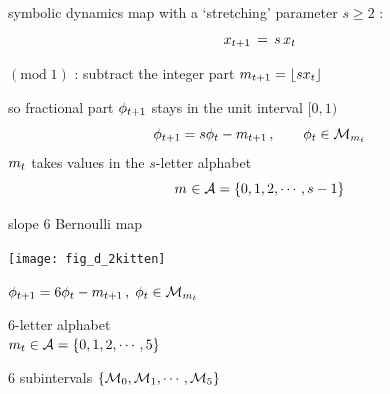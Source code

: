 \begin{frame}{symbolic dynamics} %
\renewcommand{\ssp}{\ensuremath{x}}             %
map with a {\color{blue}`stretching' parameter $s\geq2$} :
\[
\ssp_{\zeit+1} \,=\, {s}\,\ssp_{\zeit}
\] %

$(\mbox{mod}\;1)$ :
subtract the integer part
\(
\Ssym{\zeit+1}=\left\lfloor{s}\ssp_{\zeit}\right\rfloor
\)

\renewcommand{\ssp}{\ensuremath{\phi}}             %
so fractional part
$\ssp_{\zeit+1}$ stays in the unit interval $[0,1)$
\[
\ssp_{\zeit+1}
= {s} \ssp_{\zeit} - \Ssym{\zeit+1}
\,,\qquad  \ssp_{\zeit}\in\pS_{\Ssym{\zeit}}
\] %
${m_{t}}$ takes values in the ${s}$-letter alphabet
\[
{m_{}} \in \mathcal{A}=\{0,1,2,\cdots,s-1\}
\] %
\end{frame} %

\renewcommand{\ssp}{\ensuremath{\phi}}             %

\begin{frame}{}
    \begin{block}{slope ${6}$ Bernoulli map}
\begin{center}
            \begin{minipage}[c]{0.32\textwidth}\begin{center}
\texttt{[image: fig\_d\_2kitten]} %
            \end{center}\end{minipage}
            \hspace{2ex}
            \begin{minipage}[c]{0.46\textwidth}
\(
\ssp_{\zeit+1}
= {6} \ssp_{\zeit} - \Ssym{\zeit+1}
\,,\;  \ssp_{\zeit}\in\pS_{\Ssym{\zeit}}
\)
\medskip

${6}$-letter alphabet \\
\(
{m_{t}} \in \mathcal{A}=\{0,1,2,\cdots,5\}
\)
            \end{minipage}
\end{center}
$6$ subintervals $\{{\cal M}_{0},{\cal M}_{1},\cdots,{\cal M}_{5}\}$
    \end{block}
\end{frame} %

